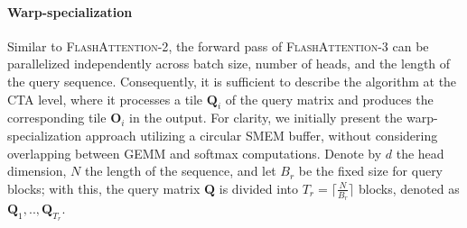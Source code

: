 \paragraph{Warp-specialization}
Similar to \textsc{FlashAttention-2}, the forward pass of \textsc{FlashAttention-3} can be parallelized independently across batch size, number of heads, and the length of the query sequence. Consequently, it is sufficient to describe the algorithm at the CTA level, where it processes a tile $\mathbf{Q}_i$ of the query matrix and produces the corresponding tile $\mathbf{O}_i$ in the output. For clarity, we initially present the warp-specialization approach utilizing a circular SMEM buffer, without considering overlapping between GEMM and softmax computations. Denote by $d$ the head dimension, $N$ the length of the sequence, and let $B_r$ be the fixed size for query blocks; with this, the query matrix $\mathbf{Q}$ is divided into $T_r = \lceil \frac{N}{B_r} \rceil$ blocks, denoted as $\mathbf{Q}_1, .., \mathbf{Q}_{T_r}$.


